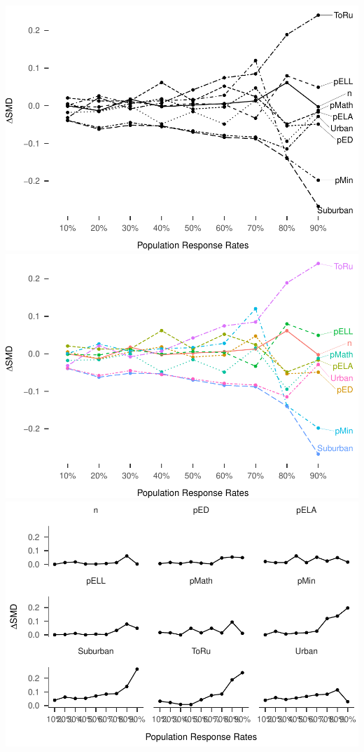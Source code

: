 \documentclass[man,floatsintext]{apa6}
\begin{document}
\includegraphics{GenSamp_Paper_files/figure-latex/fig-SMD-goal-1.pdf} \includegraphics{GenSamp_Paper_files/figure-latex/fig-SMD-goal-2.pdf} \includegraphics{GenSamp_Paper_files/figure-latex/fig-SMD-goal-3.pdf}
\end{document}
